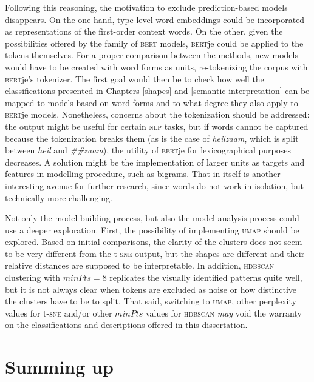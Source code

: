 \documentclass[
]{book}
\begin{document}
Following this reasoning, the motivation to exclude prediction-based models disappears. On the one hand, type-level word embeddings could be incorporated as representations of the first-order context words. On the other, given the possibilities offered by the family of \textsc{bert} models, \textsc{bert}je \autocite{devries.etal_2019} could be applied to the tokens themselves. For a proper comparison between the methods, new models would have to be created with word forms as units, re-tokenizing the corpus with \textsc{bert}je's tokenizer. The first goal would then be to check how well the classifications presented in Chapters \ref{shapes} and \ref{semantic-interpretation} can be mapped to models based on word forms and to what degree they also apply to \textsc{bert}je models. Nonetheless, concerns about the tokenization should be addressed: the output might be useful for certain \textsc{nlp} tasks, but if words cannot be captured because the tokenization breaks them (as is the case of \emph{heilzaam}, which is split between \emph{heil} and \emph{\#\#zaam}), the utility of \textsc{bert}je for lexicographical purposes decreases. A solution might be the implementation of larger units as targets and features in modelling procedure, such as bigrams. That in itself is another interesting avenue for further research, since words do not work in isolation, but technically more challenging.

Not only the model-building process, but also the model-analysis process could use a deeper exploration. First, the possibility of implementing \textsc{umap} should be explored. Based on initial comparisons, the clarity of the clusters does not seem to be very different from the t-\textsc{sne} output, but the shapes are different and their relative distances are supposed to be interpretable. In addition, \textsc{hdbscan} clustering with \(minPts = 8\) replicates the visually identified patterns quite well, but it is not always clear when tokens are excluded as noise or how distinctive the clusters have to be to split. That said, switching to \textsc{umap}, other perplexity values for t-\textsc{sne} and/or other \(minPts\) values for \textsc{hdbscan} \emph{may} void the warranty on the classifications and descriptions offered in this dissertation.

\hypertarget{contributions}{%
\section{Summing up}\label{contributions}}
\end{document}
